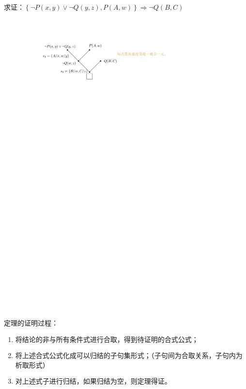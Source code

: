 \begin{note}
\begin{itemize}
        求证：$\left\{ \lnot P(x,y)\lor \lnot Q(y,z), P(A,w) \right\}\Rightarrow \lnot Q(B,C)$
        \begin{figure}[htbp]
            \centering
            \includegraphics{image/最一般合一元.pdf}
        \end{figure}        
    \end{itemize}    
\end{note}
\begin{theorem}[归结原理]
    定理的证明过程：
    \begin{enumerate}
        \item 将\textcolor{main1}{结论的非}与\textcolor{main1}{所有条件式}进行合取，得到待证明的合式公式；
        \item 将上述合式公式化成可以归结的子句集形式；（\textcolor{main1}{子句间为合取关系，子句内为析取形式}）
        \item 对上述式子进行归结，如果\textcolor{main1}{归结为空，则定理得证。}
    \end{enumerate}
\end{theorem}
